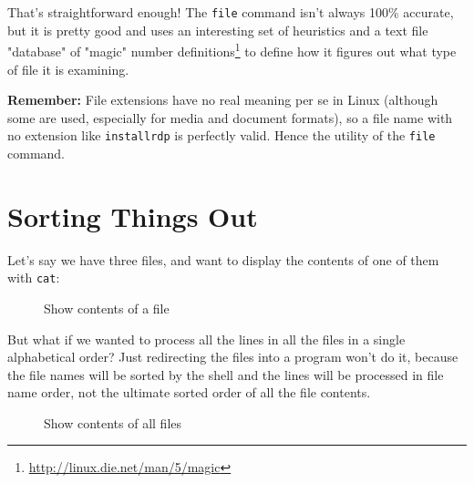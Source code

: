 \documentclass[10pt,american,]{book}
\newenvironment{Shaded}{\begin{snugshade}}{\end{snugshade}}
\newcommand{\KeywordTok}[1]{\textcolor[rgb]{0.13,0.29,0.53}{\textbf{{#1}}}}
\newcommand{\NormalTok}[1]{{#1}}
\renewcommand{\href}[2]{#2\footnote{\url{#1}}}
\numberwithin{figure}{chapter}
\DeclareRobustCommand{\drcap}[1]{\begin{figure}[H]\caption{#1}\end{figure}}
\renewcommand{\KeywordTok}[1]{{#1}}
\renewcommand{\NormalTok}[1]{{#1}}
\begin{document}
That's straightforward enough! The \texttt{file} command isn't always
100\% accurate, but it is pretty good and uses an interesting set of
heuristics and a text file "database" of
\href{http://linux.die.net/man/5/magic}{"magic" number definitions} to
define how it figures out what type of file it is examining.

\textbf{Remember:} File extensions have no real meaning per se in Linux
(although some are used, especially for media and document formats), so
a file name with no extension like \texttt{installrdp} is perfectly
valid. Hence the utility of the \texttt{file} command.

\section*{Sorting Things Out}\label{sorting-things-out}

Let's say we have three files, and want to display the contents of one
of them with \texttt{cat}:

\drcap{Show contents of a file}

\begin{Shaded}
\end{Shaded}

But what if we wanted to process all the lines in all the files in a
single alphabetical order? Just redirecting the files into a program
won't do it, because the file names will be sorted by the shell and the
lines will be processed in file name order, not the ultimate sorted
order of all the file contents.

\drcap{Show contents of all files}

\begin{Shaded}
\end{Shaded}
\end{document}
